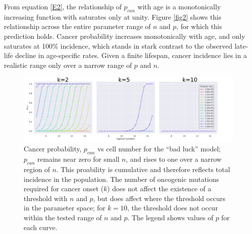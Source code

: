\documentclass[12pt,onecolumn,twoside]{article}
\begin{document}
From equation \ref{E2}, the relationship of $p_{can}$ with age is a monotonically increasing function with saturates only at unity. Figure \ref{fig2} shows this relationship across the entire parameter range of $n$ and $p$, for which this prediction holds. Cancer probability increases monotonically with age, and only saturates at 100\% incidence, which stands in stark contrast to the observed late-life decline in age-specific rates. Given a finite lifespan, cancer incidence lies in a realistic range only over a narrow range of $p$ and $n$.
\begin{figure}[!th]
	\centering
	\includegraphics[width=\linewidth]{fig1.png}
	\caption{ Cancer probability, $p_{can}$ vs cell number for the ``bad luck'' model; $p_{can}$ remains near zero for small $n$, and rises to one over a narrow region of $n$. This proability is cumulative and therefore reflects total incidence in the population. The number of oncogenic mutations required for cancer onset ($k$) does not affect the existence of a threshold with $n$ and $p$, but does affect where the threshold occurs in the parameter space; for $k=10$, the threshold does not occur within the tested range of $n$ and $p$. The legend shows values of $p$ for each curve.}
	\label{fig1}
\end{figure}
\end{document}
